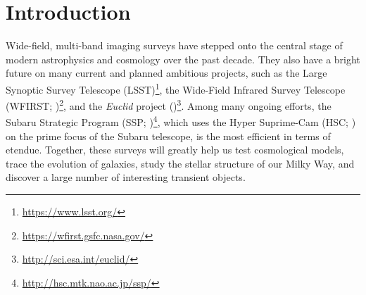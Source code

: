 \documentclass[useamsfonts]{pasj01}
\begin{document}

\section{Introduction}
    \label{sec:intro}

    Wide-field, multi-band imaging surveys have stepped onto the central stage of
    modern astrophysics and cosmology over the past decade.
    They also have a bright future on many current and planned ambitious projects, such as the Large Synoptic Survey Telescope
    (LSST)\footnote{\url{https://www.lsst.org/}}, the Wide-Field Infrared Survey
    Telescope
    (WFIRST; \citealt{Dressler2012})\footnote{\url{https://wfirst.gsfc.nasa.gov/}},
    and the \textit{Euclid} project
    (\citealt{Laureijs2012})\footnote{\url{http://sci.esa.int/euclid/}}.
    Among many ongoing efforts, the Subaru Strategic Program
    (SSP; \citealt{HSCDR1})\footnote{\url{http://hsc.mtk.nao.ac.jp/ssp/}}, which
    uses the Hyper Suprime-Cam (HSC; \citealt{Miyazaki2012}) on the prime focus of
    the Subaru telescope, is the most efficient in terms of etendue.
    Together, these surveys will greatly help us test cosmological models, trace the
    evolution of galaxies, study the stellar structure of our Milky Way, and discover
    a large number of interesting transient objects.
\end{document}
